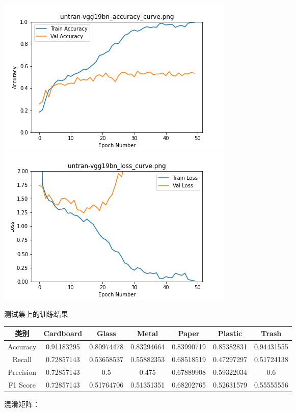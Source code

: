 \documentclass[UTF8]{ctexart}
\begin{document}
\includegraphics[scale=0.5]{image/untran-vgg19bn_accuracy_curve.png} 
\includegraphics[scale=0.5]{image/untran-vgg19bn_loss_curve.png} 

测试集上的训练结果

\begin{tabular}{|c|c|c|c|c|c|c|}
\hline 
类别 & Cardboard & Glass & Metal & Paper & Plastic & Trash \\ 
\hline 
Accuracy &0.91183295& 0.80974478& 0.83294664& 0.83990719 &0.85382831& 0.94431555\\
 \hline 
Recall &0.72857143& 0.53658537& 0.55882353& 0.68518519& 0.47297297& 0.51724138\\ 
\hline 
Precision &0.72857143& 0.5       & 0.475   &   0.67889908& 0.59322034& 0.6   \\ 
\hline 
F1 Score &0.72857143& 0.51764706 &0.51351351& 0.68202765& 0.52631579& 0.55555556 \\ 
\hline 
\end{tabular}

混淆矩阵：
\end{document}
